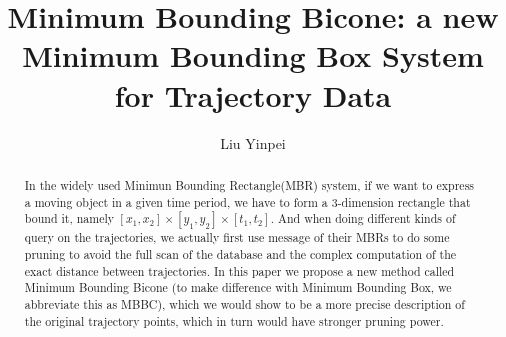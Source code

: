 \documentclass[sigplan]{acmart}
\begin{document}
\title{Minimum Bounding Bicone: a new Minimum Bounding Box System for Trajectory Data}
\author{Liu Yinpei}
\begin{abstract}
In the widely used Minimun Bounding Rectangle(MBR) system, if we want to express a moving object in a given time period, we have to form a 3-dimension rectangle that bound it, namely $[x_1,x_2] × [y_1,y_2] × [t_1,t_2]$. And when doing different kinds of query on the trajectories, we actually first use message of their MBRs to do some pruning to avoid the full scan of the database and the complex computation of the exact distance between trajectories. In this paper we propose a new method called Minimum Bounding Bicone (to make difference with Minimum Bounding Box, we abbreviate this as MBBC), which we would show to be a more precise description of the original trajectory points, which in turn would have stronger pruning power.
\end{abstract}

\maketitle
\end{document}
